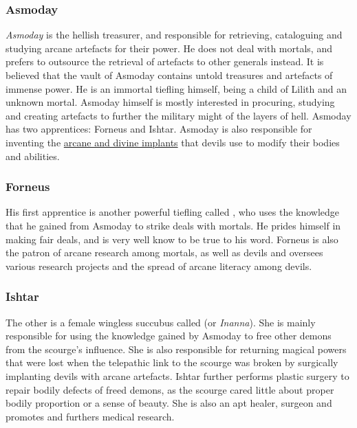 \subsubsection{Asmoday}
\label{sec:Asmoday}

\emph{Asmoday} is the hellish treasurer, and responsible for retrieving,
cataloguing and studying arcane artefacts for their power. He does not deal
with mortals, and prefers to outsource the retrieval of artefacts to other
generals instead. It is believed that the vault of Asmoday contains untold
treasures and artefacts of immense power. He is an immortal tiefling himself,
being a child of Lilith and an unknown mortal. Asmoday himself is mostly
interested in procuring, studying and creating artefacts to further the
military might of the layers of hell. Asmoday has two apprentices: Forneus and
Ishtar. Asmoday is also responsible for inventing the
\hyperref[sec:Implants]{arcane and divine implants} that devils use to modify
their bodies and abilities.

\subsubsection{Forneus}

His first apprentice is another powerful tiefling called
, who uses the knowledge that he gained from Asmoday to
strike deals with mortals. He prides himself in making fair deals, and is very
well know to be true to his word. Forneus is also the patron of arcane
research among mortals, as well as devils and oversees various research
projects and the spread of arcane literacy among devils.

\subsubsection{Ishtar}

The other is a female wingless succubus called  (or
\emph{Inanna}). She is mainly responsible for using the knowledge gained by
Asmoday to free other demons from the scourge's influence. She is also
responsible for returning magical powers that were lost when the telepathic
link to the scourge was broken by surgically implanting devils with arcane
artefacts.  Ishtar further performs plastic surgery to repair bodily defects
of freed demons, as the scourge cared little about proper bodily proportion or
a sense of beauty. She is also an apt healer, surgeon and promotes and
furthers medical research.

